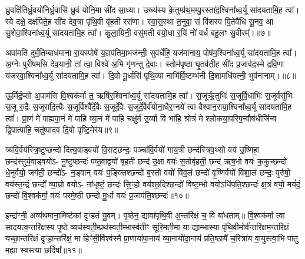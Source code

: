 {\anuvakamend[{विट्प॑ष्ठ॒वाड्वयो॒\-ऽष्टाविꣳ॑शतिश्च॥३॥}]}

ध्रु॒वक्षि॑तिर्ध्रु॒वयो॑निर्ध्रु॒वासि॑ ध्रु॒वं योनि॒मा सी॑द सा॒ध्या। उख्य॑स्य के॒तुम्प्र॑थ॒मम्पु॒रस्ता॑द॒श्विना᳚ध्व॒र्यू सा॑दयतामि॒ह त्वा᳚। स्वे दक्षे॒ दक्ष॑पिते॒ह सी॑द देव॒त्रा पृ॑थि॒वी बृ॑ह॒ती ररा॑णा। स्वा॒स॒स्था त॒नुवा॒ सं वि॑शस्व पि॒तेवै॑धि सू॒नव॒ आ सु॒शेवा॒श्विना᳚ध्व॒र्यू सा॑दयतामि॒ह त्वा᳚। कु॒ला॒यिनी॒ वसु॑मती वयो॒धा र॒यिं नो॑ वर्ध बहु॒लꣳ सु॒वीरम्᳚।॥७॥

अपा॑मतिं दुर्म॒तिम्बाध॑माना रा॒यस्पोषे॑ य॒ज्ञप॑तिमा॒भज॑न्ती॒ सुव॑र्धेहि॒ यज॑मानाय॒ पोष॑म॒श्विना᳚ध्व॒र्यू सा॑दयतामि॒ह त्वा᳚। अ॒ग्नेः पुरी॑षमसि देव॒यानी॒ तां त्वा॒ विश्वे॑ अ॒भि गृ॑णन्तु दे॒वाः। स्तोम॑पृष्ठा घृ॒तव॑ती॒ह सी॑द प्र॒जाव॑द॒स्मे द्रवि॒णा य॑जस्वा॒श्विना᳚ध्व॒र्यू सा॑दयतामि॒ह त्वा᳚। दि॒वो मू॒र्धासि॑ पृथि॒व्या नाभि॑र्वि॒ष्टम्भ॑नी दि॒शामधि॑पत्नी॒ भुव॑नानाम्।॥८॥

ऊ॒र्मिर्द्र॒प्सो अ॒पाम॑सि वि॒श्वक॑र्मा त॒ ऋषि॑र॒श्विना᳚ध्व॒र्यू सा॑दयतामि॒ह त्वा᳚। स॒जूर्\mbox{}ऋ॒तुभिः॑ स॒जूर्वि॒धाभिः॑ स॒जूर्वसु॑भिः स॒जू रु॒द्रैः स॒जूरा॑दि॒त्यैः स॒जूर्विश्वै᳚र्दे॒वैः स॒जूर्दे॒वैः स॒जूर्दे॒वैर्व॑योना॒धैर॒ग्नये᳚ त्वा वैश्वान॒राया॒श्विना᳚ध्व॒र्यू सा॑दयतामि॒ह त्वा᳚। प्रा॒णं मे॑ पाह्यपा॒नं मे॑ पाहि व्या॒नं मे॑ पाहि॒ चक्षु॑र्म उ॒र्व्या वि भा॑हि॒ श्रोत्रं॑ मे श्लोकया॒पस्पि॒न्वौष॑धीर्जिन्व द्वि॒पात्पा॑हि॒ चतु॑ष्पादव दि॒वो वृष्टि॒मेर॑य॥९॥

{\anuvakamend[{सु॒वीरं॒ भुव॑नानामु॒र्व्या स॒प्तद॑श च॥४॥}]}

त्र्यवि॒र्वय॑स्त्रि॒ष्टुप्छन्दो॑ दित्य॒वाड्वयो॑ वि॒राट्छन्दः॒ पञ्चा॑वि॒र्वयो॑ गाय॒त्री छन्द॑स्त्रिव॒थ्सो वय॑ उ॒ष्णिहा॒ छन्द॑स्तुर्य॒वाड्वयो॑\-ऽ- नु॒ष्टुप्छन्दः॑ पष्ठ॒वाद्वयो॑ बृह॒ती छन्द॑ उ॒क्षा वयः॑ स॒तोबृ॑हती॒ छन्द॑ ऋष॒भो वयः॑ क॒कुच्छन्दो॑ धे॒नुर्वयो॒ जग॑ती॒ छन्दो॑\-ऽ- न॒ड्वान् वयः॑ प॒ङ्क्तिश्छन्दो॑ ब॒स्तो वयो॑ विव॒लं छन्दो॑ वृ॒ष्णिर्वयो॑ विशा॒लं छन्दः॒ पुरु॑षो॒ वय॑स्त॒न्द्रं छन्दो᳚ व्या॒घ्रो वयो\-ऽ- ना॑धृष्टं॒ छन्दः॑ सि॒ꣳ॒हो वय॑श्छ॒दिश्छन्दो॑ विष्ट॒म्भो वयो\-ऽधि॑पति॒श्छन्दः॑ क्ष॒त्रं वयो॒ मयं॑दं॒ छन्दो॑ वि॒श्वक॑र्मा॒ वयः॑ परमे॒ष्ठी छन्दो मू॒र्धा वयः॑ प्र॒जाप॑ति॒श्छन्दः॑॥१०॥

{\anuvakamend[{पुरु॑षो॒ वय॒ष्षड्विꣳ॑शतिश्च॥५॥}]}

इन्द्रा᳚ग्नी॒ अव्य॑थमाना॒मिष्ट॑कां दृꣳहतं यु॒वम्। पृ॒ष्ठेन॒ द्यावा॑पृथि॒वी अ॒न्तरि॑क्षं च॒ वि बा॑धताम्॥ वि॒श्वक॑र्मा त्वा सादयत्व॒न्तरि॑क्षस्य पृ॒ष्ठे व्यच॑स्वती॒म्प्रथ॑स्वती॒म्भास्व॑तीꣳ सूरि॒मती॒मा या द्याम्भास्या पृ॑थि॒वीमोर्व॑न्तरि॑क्षम॒न्तरि॑क्षं यच्छा॒न्तरि॑क्षं दृꣳहा॒न्तरि॑क्षं॒ मा हिꣳ॑सी॒र्विश्व॑स्मै प्रा॒णाया॑पा॒नाय॑ व्या॒नायो॑दा॒नाय॑ प्रति॒ष्ठायै॑ च॒रित्रा॑य वा॒युस्त्वा॒भि पा॑तु म॒ह्या स्व॒स्त्या छ॒र्दिषा᳚॥११॥

